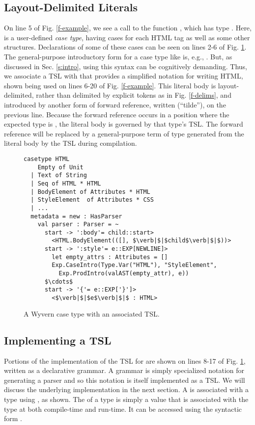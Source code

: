 \subsection{Layout-Delimited Literals}
On line 5 of Fig. \ref{f-example}, we see a call to the function , which has type . Here,  is a user-defined \emph{case type}, having cases for each HTML tag as well as some other structures. Declarations  of some of these cases can be seen on lines 2-6 of Fig. \ref{f-htmltype}. The general-purpose introductory form for a case type like  is, e.g., . But, as discussed in Sec. \ref{s:intro}, using this syntax can be cognitively demanding. Thus, we associate a TSL with  that provides a simplified notation for writing HTML, shown being used on lines 6-20 of Fig. \ref{f-example}. This literal body is layout-delimited, rather than delimited by explicit tokens as in Fig. \ref{f-delims}, and introduced by another form of forward reference, written \li{~} (``tilde''), on the previous line. Because the forward reference occurs in a position where the expected type is , the literal body is governed by that type's TSL. The forward reference will be replaced by a general-purpose term of type  generated from the literal body by the TSL during compilation.
\begin{figure}[t]
\begin{lstlisting}[escapechar=$]
casetype HTML 
    Empty of Unit
  | Text of String
  | Seq of HTML * HTML 
  | BodyElement of Attributes * HTML
  | StyleElement  of Attributes * CSS
  | ...
  metadata = new : HasParser
    val parser : Parser = ~
      start -> ':body'= child::start>
        <HTML.BodyElement(([], $\verb|$|$child$\verb|$|$))>
      start -> ':style'= e::EXP[NEWLINE]>
        let empty_attrs : Attributes = []
        Exp.CaseIntro(Type.Var("HTML"), "StyleElement",
          Exp.ProdIntro(valAST(empty_attr), e))
      $\cdots$
      start -> '{'= e::EXP['}']>
        <$\verb|$|$e$\verb|$|$ : HTML>
\end{lstlisting}
\vspace{-8px}
\caption{A Wyvern case type with an associated TSL.}
\vspace{-10px}
\label{f-htmltype}
\end{figure}

\subsection{Implementing a TSL}
Portions of the implementation of the TSL for  are shown on lines 8-17 of Fig. \ref{f-htmltype}, written as a declarative grammar. A grammar is simply specialized notation for generating a parser and so this notation is itself implemented as a TSL. We will discuss the underlying implementation in the next section. A  is associated with a type using , as shown. The  of a type  is simply a value that is associated with the type at both compile-time and run-time. It can be accessed using the syntactic form .

